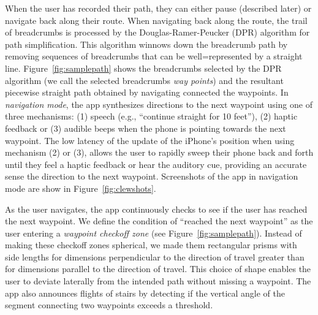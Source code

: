 \documentclass[chi_draft]{sigchi}
\begin{document}
When the user has recorded their path, they can either pause (described later) or navigate back along their route.  When navigating back along the route, the trail of breadcrumbs is processed by the Douglas-Ramer-Peucker (DPR) algorithm \cite{douglas1973algorithms} for path simplification.  This algorithm winnows down the breadcrumb path by removing sequences of breadcrumbs that can be well=represented by a straight line.  Figure~\ref{fig:samplepath} shows the breadcrumbs selected by the DPR algorithm (we call the selected breadcrumbs \emph{way points}) and the resultant piecewise straight path obtained by navigating connected the waypoints.  In \emph{navigation mode}, the app synthesizes directions to the next waypoint using one of three mechanisms: (1) speech (e.g., ``continue straight for 10 feet''), (2) haptic feedback or (3) audible beeps when the phone is pointing towards the next waypoint.  The low latency of the update of the iPhone's position when using mechanism (2) or (3), allows the user to rapidly sweep their phone back and forth until they feel a haptic feedback or hear the auditory cue, providing an accurate sense the direction to the next waypoint.  Screenshots of the app in navigation mode are show in Figure~\ref{fig:clewshots}.

As the user navigates, the app continuously checks to see if the user has reached the next waypoint.  We define the condition of ``reached the next waypoint'' as the user entering a \emph{waypoint checkoff zone} (see Figure~\ref{fig:samplepath}).  Instead of making these checkoff zones spherical, we made them rectangular prisms with side lengths for dimensions perpendicular to the direction of travel greater than for dimensions parallel to the direction of travel.  This choice of shape enables the user to deviate laterally from the intended path without missing a waypoint.  The app also announces flights of stairs by detecting if the vertical angle of the segment connecting two waypoints exceeds a threshold.
\end{document}
